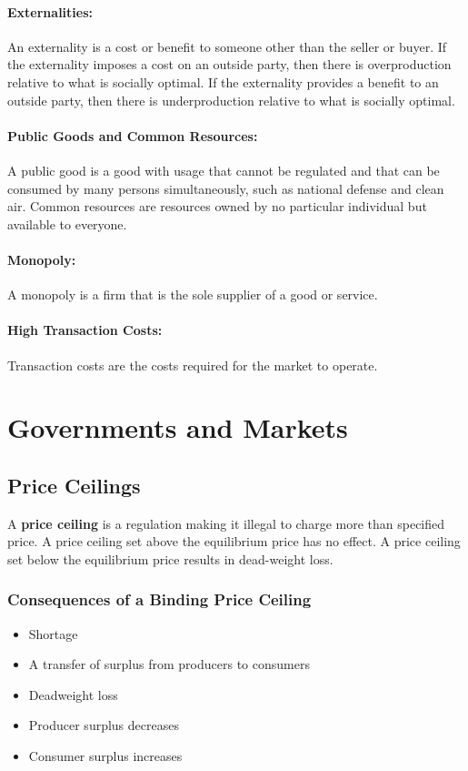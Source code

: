 \documentclass[letterpaper, 12pt]{article}
\begin{document}
\paragraph{Externalities:}
An externality is a cost or benefit to someone other than the seller or buyer.
If the externality imposes a cost on an outside party, then there is
overproduction relative to what is socially optimal. If the externality provides
a benefit to an outside party, then there is underproduction relative to what is
socially optimal.

\paragraph{Public Goods and Common Resources:}
A public good is a good with usage that cannot be regulated and that can be
consumed by many persons simultaneously, such as national defense and clean air.
Common resources are resources owned by no particular individual but available
to everyone.

\paragraph{Monopoly:}
A monopoly is a firm that is the sole supplier of a good or service.

\paragraph{High Transaction Costs:}
Transaction costs are the costs required for the market to operate.

\section{Governments and Markets}

\subsection{Price Ceilings}
A \textbf{price ceiling} is a regulation making it illegal to charge more than
specified price. A price ceiling set above the equilibrium price has no effect.
A price ceiling set below the equilibrium price results in dead-weight loss.

\subsubsection{Consequences of a Binding Price Ceiling}
\begin{itemize}
  \item Shortage
  \item A transfer of surplus from producers to consumers
  \item Deadweight loss
  \item Producer surplus decreases
  \item Consumer surplus increases
\end{itemize}
\end{document}
